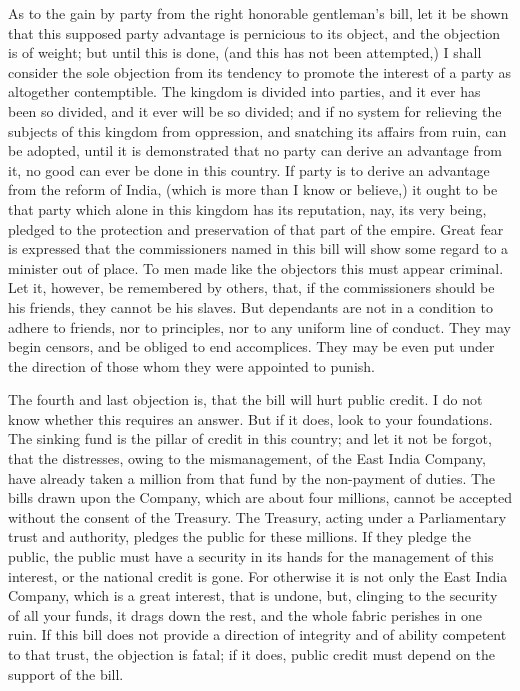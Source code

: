 As to the gain by party from the right honorable gentleman's bill, let it be shown that this supposed party advantage is pernicious to its object, and the objection is of weight; but until this is done, (and this has not been attempted,) I shall consider the sole objection from its tendency to promote the interest of a party as altogether contemptible. The kingdom is divided into parties, and it ever has been so divided, and it ever will be so divided; and if no system for relieving the subjects of this kingdom from oppression, and snatching its affairs from ruin, can be adopted, until it is demonstrated that no party can derive an advantage from it, no good can ever be done in this country. If party is to derive an advantage from the reform of India, (which is more than I know or believe,) it ought to be that party which alone in this kingdom has its reputation, nay, its very being, pledged to the protection and preservation of that part of the empire. Great fear is expressed that the commissioners named in this bill will show some regard to a minister out of place. To men made like the objectors this must appear criminal. Let it, however, be remembered by others, that, if the commissioners should be his friends, they cannot be his slaves. But dependants are not in a condition to adhere to friends, nor to principles, nor to any uniform line of conduct. They may begin censors, and be obliged to end accomplices. They may be even put under the direction of those whom they were appointed to punish.

The fourth and last objection is, that the bill will hurt public credit. I do not know whether this requires an answer. But if it does, look to your foundations. The sinking fund is the pillar of credit in this country; and let it not be forgot, that the distresses, owing to the mismanagement, of the East India Company, have already taken a million from that fund by the non-payment of duties. The bills drawn upon the Company, which are about four millions, cannot be accepted without the consent of the Treasury. The Treasury, acting under a Parliamentary trust and authority, pledges the public for these millions. If they pledge the public, the public must have a security in its hands for the management of this interest, or the national credit is gone. For otherwise it is not only the East India Company, which is a great interest, that is undone, but, clinging to the security of all your funds, it drags down the rest, and the whole fabric perishes in one ruin. If this bill does not provide a direction of integrity and of ability competent to that trust, the objection is fatal; if it does, public credit must depend on the support of the bill.

